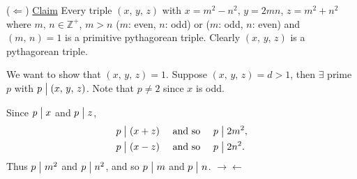 ($\Leftarrow$) \underline{Claim} Every triple $\left( x,\,y,\,z \right)$ with
$x=m^2-n^2$, $y=2mn$, $z=m^2+n^2$ where $m,\,n\in\mathbb{Z}^+$, $m>n$ ($m$: even, $n$: odd)
or ($m$: odd, $n$: even) and $\left( m,\,n \right)=1$ is a primitive pythagorean triple.
Clearly $\left( x,\,y,\,z \right)$ is a pythagorean triple.

We want to show that $\left( x,\,y,\,z \right)=1$. Suppose $\left( x,\,y,\,z \right)=d>1$,
then $\exists$ prime $p$ with $p \bigm| \left( x,\,y,\,z \right)$.
Note that $p\neq 2$ since $x$ is odd.

Since $p \bigm| x$ and $p \bigm| z$,
\begin{align*}
    p \bigm| \left(x+z\right) & \quad \mbox{ and so } \quad p\bigm| 2m^2,\\
    p \bigm| \left(x-z\right) & \quad \mbox{ and so } \quad p\bigm| 2n^2.
\end{align*}
Thus $p \bigm| m^2$ and $p \bigm| n^2$, and so $p \bigm| m$ and $p \bigm| n$.
$\rightarrow\leftarrow$

